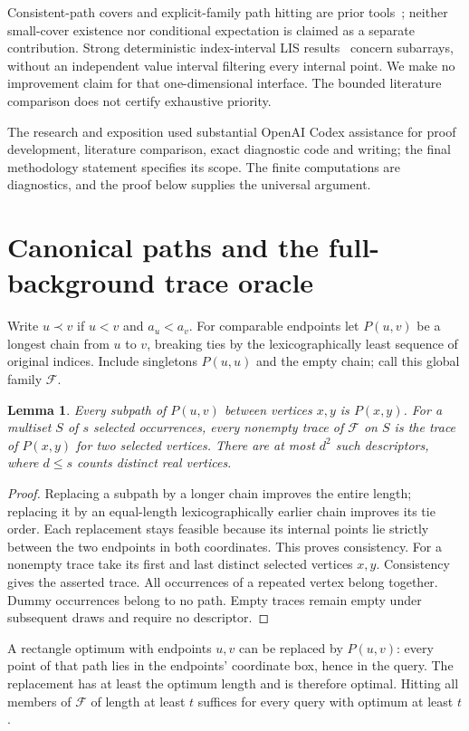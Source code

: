 \documentclass[acmsmall,11pt,nonacm,natbib=false]{acmart}
\newtheorem{lemma}[theorem]{Lemma}
\begin{document}
Consistent-path covers and explicit-family path hitting are prior
tools~\cite{TSP11,ACC19}; neither small-cover existence nor conditional
expectation is claimed as a separate contribution. Strong deterministic
index-interval LIS results~\cite{GGK25,Kor26} concern subarrays, without an
independent value interval filtering every internal point. We make no
improvement claim for that one-dimensional interface. The bounded literature
comparison does not certify exhaustive priority.

The research and exposition used substantial OpenAI Codex assistance for
proof development, literature comparison, exact diagnostic code and writing;
the final methodology statement specifies its scope. The finite computations
are diagnostics, and the proof below supplies the universal argument.

\section{Canonical paths and the full-background trace oracle}
Write $u\prec v$ if $u<v$ and $a_u<a_v$. For comparable endpoints let
$P(u,v)$ be a longest chain from $u$ to $v$, breaking ties by the
lexicographically least sequence of original indices. Include singletons
$P(u,u)$ and the empty chain; call this global family $\mathcal F$.

\begin{lemma}\label{lem:consistency}
Every subpath of $P(u,v)$ between vertices $x,y$ is $P(x,y)$. For a multiset
$S$ of $s$ selected occurrences, every nonempty trace of $\mathcal F$ on
$S$ is the trace of $P(x,y)$ for two selected vertices. There are at most
$d^2$ such descriptors, where $d\leq s$ counts distinct real vertices.
\end{lemma}
\begin{proof}
Replacing a subpath by a longer chain improves the entire length; replacing
it by an equal-length lexicographically earlier chain improves its tie order.
Each replacement stays feasible because its internal points lie strictly
between the two endpoints in both coordinates. This proves consistency.
For a nonempty trace take its first and last distinct selected vertices
$x,y$. Consistency gives the asserted trace. All occurrences of a repeated
vertex belong together. Dummy occurrences belong to no path. Empty traces
remain empty under subsequent draws and require no descriptor.
\end{proof}

A rectangle optimum with endpoints $u,v$ can be replaced by $P(u,v)$:
every point of that path lies in the endpoints' coordinate box, hence in the
query. The replacement has at least the optimum length and is therefore
optimal. Hitting all members of $\mathcal F$ of length at least $t$ suffices
for every query with optimum at least $t$.
\end{document}

